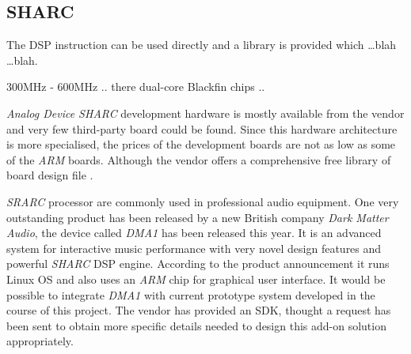 \subsection{SHARC}

  The DSP instruction can be used directly and a library is provided
 which \dots blah \dots blah.

300MHz - 600MHz .. there dual-core Blackfin chips ..


  \emph{Analog Device SHARC} development hardware is mostly available
 from the vendor and very few third-party board could be found. Since
 this hardware architecture is more specialised, the prices of the 
 development boards are not as low as some of the \emph{ARM} boards.
  Although the vendor offers a comprehensive free library of board
 design file \cite{links:adi:freepcb}.


  \emph{SRARC} processor are commonly used in professional audio
 equipment. One very outstanding product has been released by
 a new British company \emph{Dark Matter Audio}, the device called
 \emph{DMA1} \cite{links:dma1} has been released this year.
 It is an advanced system for interactive music performance with
 very novel design features and powerful \emph{SHARC} DSP engine.
 According to the product announcement it runs Linux OS and also
 uses an \emph{ARM} chip for graphical user interface. It would be
 possible to integrate \emph{DMA1} with current prototype system
 developed in the course of this project. The vendor has provided
 an SDK, thought a request has been sent to obtain more specific
 details needed to design this add-on solution appropriately.
 
